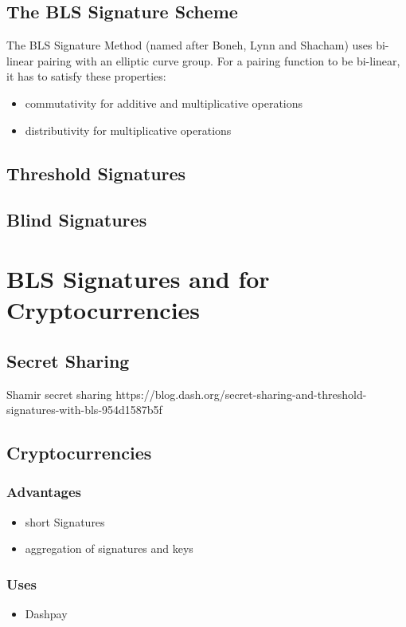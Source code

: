 \documentclass[a4paper,12pt]{scrartcl}
\begin{document}
\subsection{The BLS Signature Scheme}
The BLS Signature Method (named after Boneh, Lynn and Shacham) uses bi-linear pairing with an elliptic curve group.
\newline
For a pairing function to be bi-linear, it has to satisfy these properties:
\begin{itemize}
	\item commutativity for additive and multiplicative operations
	\item distributivity for multiplicative operations
\end{itemize}

\subsection{Threshold Signatures}

\subsection{Blind Signatures}

\pagebreak

\section{BLS Signatures and for Cryptocurrencies}
\subsection{Secret Sharing}
Shamir secret sharing https://blog.dash.org/secret-sharing-and-threshold-signatures-with-bls-954d1587b5f
\subsection{Cryptocurrencies}
\subsubsection{Advantages}
\begin{itemize}
	\item short Signatures
	\item aggregation of signatures and keys
\end{itemize}

\subsubsection{Uses}
\begin{itemize}
	\item Dashpay
\end{itemize}
\end{document}
